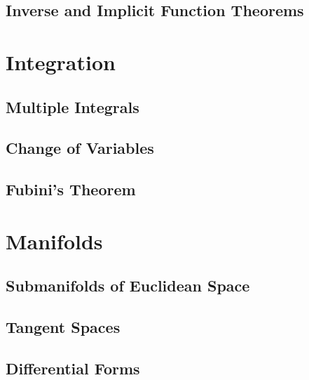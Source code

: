 \documentclass{book}
\begin{document}
\section{Inverse and Implicit Function Theorems}

\chapter{Integration}
\section{Multiple Integrals}
\section{Change of Variables}
\section{Fubini's Theorem}

\chapter{Manifolds}
\section{Submanifolds of Euclidean Space}
\section{Tangent Spaces}
\section{Differential Forms}

\printindex
\end{document}
